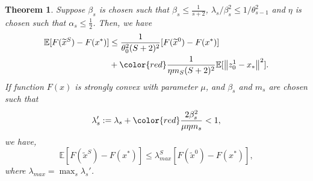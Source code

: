 \documentclass[10pt, conference, compsocconf]{IEEEtran}
\newcommand*{\E}{\mathbb{E}}
\newcommand{\norm}[1]{\left\lVert#1\right\rVert}
\newtheorem{theorem}{Theorem}[section]
\theoremstyle{definition}
\theoremstyle{remark}
\begin{document}
\begin{theorem}
Suppose $\beta_s$ is chosen such that $\beta_s\leq \frac{1}{s+2}$,  $\lambda_s/\beta_s^2 \leq 1/\theta_{s-1}^2$ and $\eta$ is chosen such that $\alpha_s\leq \frac{1}{2}$.
Then, we have
\begin{equation}
\begin{split}
{\E[F(\widetilde{x}^S)-F(x^*)]}&\leq \frac{1}{\theta_{0}^2(S+2)^2}[F(\widetilde{x}^{0})-F(x^*)] \\ 
& + {\color{red}\frac{1}{\eta m_{S}(S+2)^2}}\E[\norm{z_{0}^1-x_*}^2].
\end{split}
\end{equation}
If function $F(x)$ is strongly convex with parameter $\mu$, and $\beta_s$ and $m_s$ are chosen such that
\[
\lambda_s' := \lambda_s+{\color{red}\frac{2 \beta_s^2}{\mu\eta m_s}} < 1,
\]
we have, 
\begin{equation}
\E\left[F(\widetilde{x}^S)-F(x^*)\right]\leq \lambda_{max}^S\left[F(\widetilde{x}^0)-F(x^*)\right],
\end{equation}
where $\lambda_{max} = \max_{s}{\lambda_s'}$.
\end{theorem}
\end{document}

